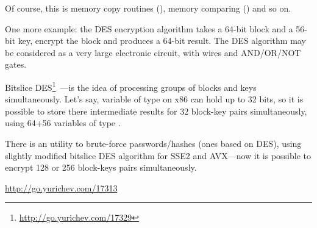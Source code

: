 Of course, this is memory copy routines (), memory comparing () and so on.


One more example: the DES encryption algorithm takes a 64-bit block and a 56-bit key, encrypt the block and produces a 64-bit result.
The DES algorithm may be considered as a very large electronic circuit, with wires and AND/OR/NOT gates.

\label{bitslicedes}
\newcommand{\URLBS}{\url{http://go.yurichev.com/17329}}

Bitslice DES\footnote{\URLBS}~---is the idea of processing groups of blocks and keys simultaneously.
Let's say, variable of type  on x86 can hold up to 32 bits, so it is possible to store there
intermediate results for 32 block-key pairs simultaneously, using 64+56 variables of type .

\myindex{\oracle}
There is an utility to brute-force \oracle passwords/hashes (ones based on DES),
using slightly modified bitslice DES algorithm for SSE2 and AVX---now it is possible to encrypt 128 
or 256 block-keys pairs simultaneously.

\url{http://go.yurichev.com/17313}




